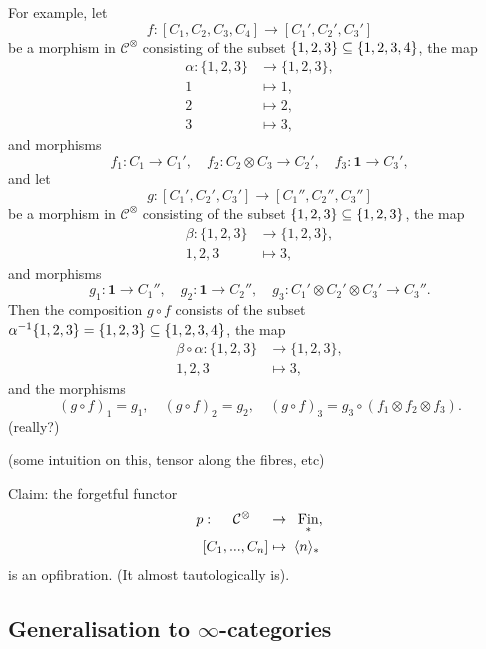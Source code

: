 \documentclass{MetricNotes2023}
\def\subq{\ensuremath\subseteq}
\DeclareMathOperator{\Fin}{Fin}
\begin{document}
For example, let 
\[f : [C_1, C_2, C_3, C_4]\to [C_1', C_2', C_3']\]
be a morphism in \(\mathcal{C}^\otimes\) consisting of the subset \(\{1, 2, 3\}\subq \{1, 2, 3, 4\}\), the map
\begin{align*}
\alpha : \{1, 2, 3\}&\to \{1, 2, 3\},\\
1 &\mapsto 1,\\
2 &\mapsto 2,\\
3 &\mapsto 3,
\end{align*}
and morphisms
\[f_1 : C_1 \to C_1', \quad f_2 : C_2 \otimes C_3 \to C_2', \quad f_3 : \textbf{1}\to C_3',\]
and let 
\[g : [C_1', C_2', C_3'] \to [C_1'', C_2'', C_3'']\]
be a morphism in \(\mathcal{C}^\otimes\) consisting of the subset \(\{1, 2, 3\}\subq \{1, 2, 3\}\), the map
\begin{align*}
\beta : \{1, 2, 3\}&\to \{1, 2, 3\},\\
1, 2, 3 &\mapsto 3,
\end{align*}
and morphisms
\[g_1 : \textbf{1} \to C_1'', \quad g_2 : \textbf{1} \to C_2'', \quad g_3 : C_1'\otimes C_2'\otimes C_3' \to C_3''.\]
Then the composition \(g \circ f \) consists of the subset \(\alpha^{-1}\{1, 2, 3\}=\{1, 2, 3\}\subq \{1, 2, 3, 4\}\), the map
\begin{align*}
\beta \circ \alpha : \{1, 2, 3\}&\to \{1, 2, 3\},\\
1, 2, 3 &\mapsto 3,
\end{align*}
and the morphisms
\[(g\circ f)_1 =g_1, \quad (g\circ f)_2 = g_2, \quad (g \circ f)_3 = g_3 \circ (f_1 \otimes f_2 \otimes f_3).\]
(really?)

(some intuition on this, tensor along the fibres, etc)

Claim: the forgetful functor
\begin{align*}
p : \quad\;\mathcal{C}^\otimes \quad\;&\to \;\;\Fin_*,\\
[C_1, ..., C_n] &\mapsto \;\ang{n}_*
\end{align*}
is an opfibration. (It almost tautologically is). 

\subsection{Generalisation to \(\infty\)-categories}
\end{document}
